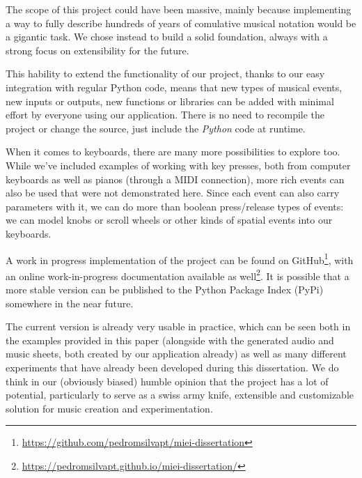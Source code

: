 \documentclass[a4paper,UKenglish,cleveref, autoref]{oasics-v2019}
\begin{document}
The scope of this project could have been massive, mainly because implementing a way to fully describe hundreds of years of comulative musical notation would be a gigantic task. We chose instead to build a solid foundation, always with a strong focus on extensibility for the future.

This hability to extend the functionality of our project, thanks to our easy integration with regular Python code, means that new types of musical events, new inputs or outputs, new functions or libraries can be added with minimal effort by everyone using our application. There is no need to recompile the project or change the source, just include the \textit{Python} code at runtime.

When it comes to keyboards, there are many more possibilities to explore too. While we've included  examples of working with key presses, both from computer keyboards as well as pianos (through a MIDI connection), more rich events can also be used that were not demonstrated here. Since each event can also carry parameters with it, we can do more than boolean press/release types of events: we can model knobs or scroll wheels or other kinds of spatial events into our keyboards.

A work in progress implementation of the project can be found on GitHub\footnote{\url{https://github.com/pedromsilvapt/miei-dissertation}}, with an online work-in-progress documentation available as well\footnote{\url{https://pedromsilvapt.github.io/miei-dissertation/}}. It is possible that a more stable version can be published to the Python Package Index (PyPi) somewhere in the near future.

The current version is already very usable in practice, which can be seen both in the examples provided in this paper (alongside with the generated audio and music sheets, both created by our application already) as well as many different experiments that have already been developed during this dissertation. We do think in our (obviously biased) humble opinion that the project has a lot of potential, particularly to serve as a swiss army knife, extensible and customizable solution for music creation and experimentation.


\end{document}
